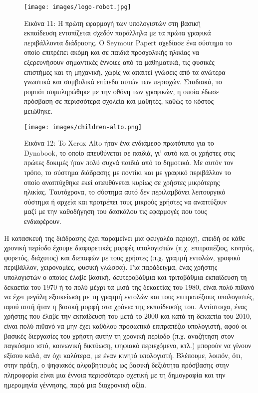 \documentclass[
]{article}
\begin{document}
\leavevmode{}%
\begin{figure}
\hypertarget{fig:logo-robot}{%
\centering
\texttt{[image: images/logo-robot.jpg]}
\caption{Εικόνα 11: Η πρώτη εφαρμογή των υπολογιστών στη βασική
εκπαίδευση εντοπίζεται σχεδόν παράλληλα με τα πρώτα γραφικά περιβάλλοντα
διάδρασης. Ο Seymour Papert σχεδίασε ένα σύστημα το οποίο επιτρέπει
ακόμη και σε παιδιά προσχολικής ηλικίας να εξερευνήσουν σημαντικές
έννοιες από τα μαθηματικά, τις φυσικές επιστήμες και τη μηχανική, χωρίς
να απαιτεί γνώσεις από τα ανώτερα γνωστικά και συμβολικά επίπεδα αυτών
των περιοχών. Σταδιακά, το ρομπότ συμπληρώθηκε με την οθόνη των
γραφικών, η οποία έδωσε πρόσβαση σε περισσότερα σχολεία και μαθητές,
καθώς το κόστος μειώθηκε.}\label{fig:logo-robot}
}
\end{figure}

\leavevmode{}%
\begin{figure}
\hypertarget{fig:children-alto}{%
\centering
\texttt{[image: images/children-alto.png]}
\caption{Εικόνα 12: To Xerox Alto ήταν ένα ενδιάμεσο πρωτότυπο για το
Dynabook, το οποίο απευθύνεται σε παιδιά, γι' αυτό και οι χρήστες στις
πρώτες δοκιμές ήταν πολύ συχνά παιδιά από το δημοτικό. Με αυτόν τον
τρόπο, το σύστημα διάδρασης με ποντίκι και με γραφικό περιβάλλον το
οποίο αναπτύχθηκε εκεί απευθύνεται κυρίως σε χρήστες μικρότερης ηλικίας.
Ταυτόχρονα, το σύστημα αυτό δεν περιλαμβάνει λειτουργικό σύστημα ή
αρχεία και προτρέπει τους μικρούς χρήστες να αναπτύξουν μαζί με την
καθοδήγηση του δασκάλου τις εφαρμογές που τους
ενδιαφέρουν.}\label{fig:children-alto}
}
\end{figure}

Η κατασκευή της διάδρασης έχει παραμείνει μια φευγαλέα περιοχή, επειδή
σε κάθε χρονική περίοδο έχουμε διαφορετικές μορφές υπολογιστών (π.χ.
επιτραπέζιος, κινητός, φορετός, διάχυτος) και διεπαφών με τους χρήστες
(π.χ. γραμμή εντολών, γραφικό περιβάλλον, χειρονομίες, φυσική γλώσσα).
Για παράδειγμα, ένας χρήστης υπολογιστών ο οποίος έλαβε βασική,
δευτεροβάθμια και τριτοβάθμια εκπαίδευση τη δεκαετία του 1970 ή το πολύ
μέχρι τα μισά της δεκαετίας του 1980, είναι πολύ πιθανό να έχει μεγάλη
εξοικείωση με τη γραμμή εντολών και τους επιτραπέζιους υπολογιστές, αφού
αυτή ήταν η βασική μορφή στα χρόνια της εκπαίδευσής του. Αντίστοιχα,
ένας χρήστης που έλαβε την εκπαίδευσή του μετά το 2000 και κατά τη
δεκαετία του 2010, είναι πολύ πιθανό να μην έχει καθόλου προσωπικό
επιτραπέζιο υπολογιστή, αφού οι βασικές διεργασίες του χρήστη αυτήν τη
χρονική περίοδο (π.χ. αναζήτηση στον παγκόσμιο ιστό, κοινωνική δικτύωση,
ψηφιακό περιεχόμενο, κτλ.) μπορούν να γίνουν εξίσου καλά, αν όχι
καλύτερα, με έναν κινητό υπολογιστή. Βλέπουμε, λοιπόν, ότι, στην πράξη,
ο ψηφιακός αλφαβητισμός ως βασική δεξιότητα πρόσβασης στην πληροφορία
είναι μια έννοια περισσότερο σχετική με τη δημογραφία και την ημερομηνία
γέννησης, παρά μια διαχρονική αξία.
\end{document}
